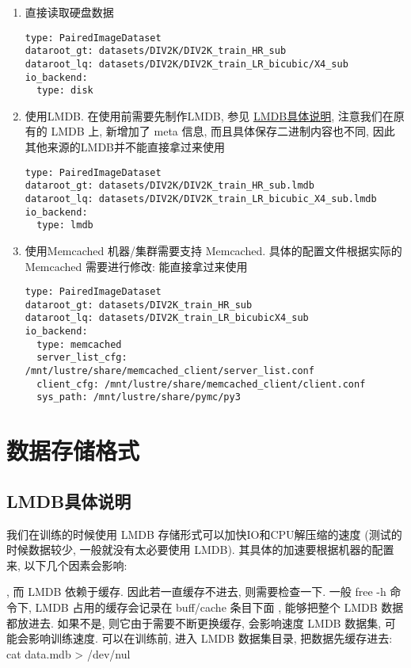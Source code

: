 \documentclass[../main.tex]{subfiles}
\begin{document}
\begin{enumerate}
    \item 直接读取硬盘数据
          \begin{verbatim}
type: PairedImageDataset
dataroot_gt: datasets/DIV2K/DIV2K_train_HR_sub
dataroot_lq: datasets/DIV2K/DIV2K_train_LR_bicubic/X4_sub
io_backend:
  type: disk
\end{verbatim}

    \item 使用LMDB. 在使用前需要先制作LMDB, 参见 \href{https://github.com/XPixelGroup/BasicSR/blob/master/docs/DatasetPreparation_CN.md#LMDB%E5%85%B7%E4%BD%93%E8%AF%B4%E6%98%8E}{LMDB具体说明}, 注意我们在原有的 LMDB 上, 新增加了 meta 信息, 而且具体保存二进制内容也不同, 因此其他来源的LMDB并不能直接拿过来使用
          \begin{verbatim}
type: PairedImageDataset
dataroot_gt: datasets/DIV2K/DIV2K_train_HR_sub.lmdb
dataroot_lq: datasets/DIV2K/DIV2K_train_LR_bicubic_X4_sub.lmdb
io_backend:
  type: lmdb
\end{verbatim}

    \item 使用Memcached 机器/集群需要支持 Memcached. 具体的配置文件根据实际的 Memcached 需要进行修改:
          能直接拿过来使用
          \begin{verbatim}
type: PairedImageDataset
dataroot_gt: datasets/DIV2K_train_HR_sub
dataroot_lq: datasets/DIV2K_train_LR_bicubicX4_sub
io_backend:
  type: memcached
  server_list_cfg: /mnt/lustre/share/memcached_client/server_list.conf
  client_cfg: /mnt/lustre/share/memcached_client/client.conf
  sys_path: /mnt/lustre/share/pymc/py3
\end{verbatim}
\end{enumerate}


\section{数据存储格式}\label{data_preparation:data_format}

\subsection{LMDB具体说明}

我们在训练的时候使用 LMDB 存储形式可以加快IO和CPU解压缩的速度 (测试的时候数据较少, 一般就没有太必要使用 LMDB). 其具体的加速要根据机器的配置来, 以下几个因素会影响:
\begin{enumerate}
    , 而 LMDB 依赖于缓存. 因此若一直缓存不进去, 则需要检查一下. 一般 free -h 命令下, LMDB 占用的缓存会记录在 buff/cache 条目下面
    , 能够把整个 LMDB 数据都放进去. 如果不是, 则它由于需要不断更换缓存, 会影响速度
     LMDB 数据集, 可能会影响训练速度. 可以在训练前, 进入 LMDB 数据集目录, 把数据先缓存进去: cat data.mdb > /dev/nul
\end{enumerate}
\end{document}
